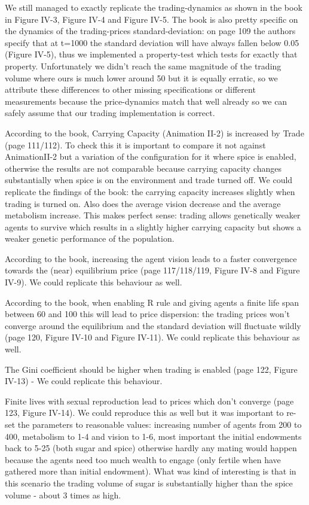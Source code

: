 We still managed to exactly replicate the trading-dynamics as shown in the book in Figure IV-3, Figure IV-4 and Figure IV-5. The book is also pretty specific on the dynamics of the trading-prices standard-deviation: on page 109 the authors specify that at t=1000 the standard deviation will have always fallen below 0.05 (Figure IV-5), thus we implemented a property-test which tests for exactly that property. Unfortunately we didn't reach the same magnitude of the trading volume where ours is much lower around 50 but it is equally erratic, so we attribute these differences to other missing specifications or different measurements because the price-dynamics match that well already so we can safely assume that our trading implementation is correct.

According to the book, Carrying Capacity (Animation II-2) is increased by Trade (page 111/112). To check this it is important to compare it not against AnimationII-2 but a variation of the configuration for it where spice is enabled, otherwise the results are not comparable because carrying capacity changes substantially when spice is on the environment and trade turned off. We could replicate the findings of the book: the carrying capacity increases slightly when trading is turned on. Also does the average vision decrease and the average metabolism increase. This makes perfect sense: trading allows genetically weaker agents to survive which results in a slightly higher carrying capacity but shows a weaker genetic performance of the population.

According to the book, increasing the agent vision leads to a faster convergence towards the (near) equilibrium price (page 117/118/119, Figure IV-8 and Figure IV-9). We could replicate this behaviour as well.

According to the book, when enabling R rule and giving agents a finite life span between 60 and 100 this will lead to price dispersion: the trading prices won't converge around the equilibrium and the standard deviation will fluctuate wildly (page 120, Figure IV-10 and Figure IV-11). We could replicate this behaviour as well.

The Gini coefficient should be higher when trading is enabled (page 122, Figure IV-13) - We could replicate this behaviour.

Finite lives with sexual reproduction lead to prices which don't converge (page 123, Figure IV-14). We could reproduce this as well but it was important to re-set the parameters to reasonable values: increasing number of agents from 200 to 400, metabolism to 1-4 and vision to 1-6, most important the initial endowments back to 5-25 (both sugar and spice) otherwise hardly any mating would happen because the agents need too much wealth to engage (only fertile when have gathered more than initial endowment). What was kind of interesting is that in this scenario the trading volume of sugar is substantially higher than the spice volume - about 3 times as high. 

